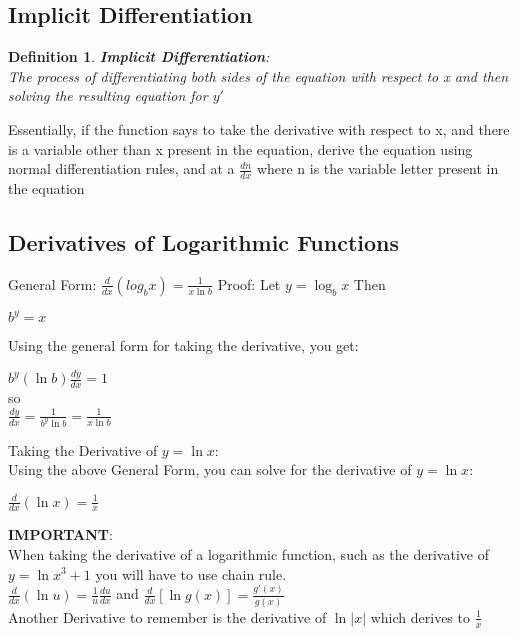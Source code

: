 \documentclass[10pt,a4paper]{article}
\newtheorem{definition}{Definition}
\begin{document}
	\subsection{Implicit Differentiation}
	\begin{definition}
		\textbf{Implicit Differentiation}:
		\\ The process of differentiating both sides of the equation with respect to x and then solving the resulting equation for $y'$
	\end{definition}
	Essentially, if the function says to take the derivative with respect to x, and there is a variable other than x present in the equation, derive the equation using normal differentiation rules, and at a $\frac{dn}{dx}$ where n is the variable letter present in the equation
	\subsection{Derivatives of Logarithmic Functions}
		General Form: $\frac{d}{dx}(log_{b}{x}) = \frac{1}{x\ln{b}}$
		Proof: Let $y=\log_{b}{x}$ Then
		\begin{center}
			$b^{y}=x$
		\end{center}
		Using the general form for taking the derivative, you get:
		\begin{center}
			$b^{y}(\ln{b})\frac{dy}{dx}=1$
			\\so
			\\$\frac{dy}{dx}=\frac{1}{b^{y}\ln{b}} = \frac{1}{x\ln{b}}$
		\end{center}
		Taking the Derivative of $y=\ln{x}$:
		\\Using the above General Form, you can solve for the derivative of $y=\ln{x}$:
		\begin{center}
			$\frac{d}{dx}(\ln{x})=\frac{1}{x}$
		\end{center}
		\textbf{IMPORTANT}:
		\\When taking the derivative of a logarithmic function, such as the derivative of $y=\ln{x^{3}+1}$ you will have to use chain rule.
		\\$\frac{d}{dx}(\ln{u}) = \frac{1}{u}\frac{du}{dx}$ and $\frac{d}{dx}[\ln{g(x)}] = \frac{g'(x)}{g(x)}$
		\\Another Derivative to remember is the derivative of $\ln|x|$ which derives to $\frac{1}{x}$
\end{document}
